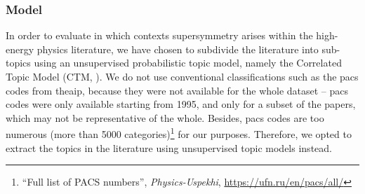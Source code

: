 \documentclass[smallextended]{svjour3}
\begin{document}
\subsubsection{Model}

In order to evaluate in which contexts supersymmetry arises within the high-energy physics literature, we have chosen to subdivide the literature into sub-topics using an unsupervised probabilistic topic model, namely the Correlated Topic Model (CTM, \citealt{Blei2007}). We do not use conventional classifications such as the \gls{pacs} codes from the\gls{aip}, because they were not available for the whole dataset -- \gls{pacs} codes were only available starting from 1995, and only for a subset of the papers, which may not be representative of the whole. Besides, \gls{pacs} codes are too numerous (more than 5000 categories)\footnote{``Full list of PACS numbers'', \textit{
Physics-Uspekhi}, \url{https://ufn.ru/en/pacs/all/}} for our purposes. Therefore, we opted to extract the topics in the literature using unsupervised topic models instead. %
\end{document}
